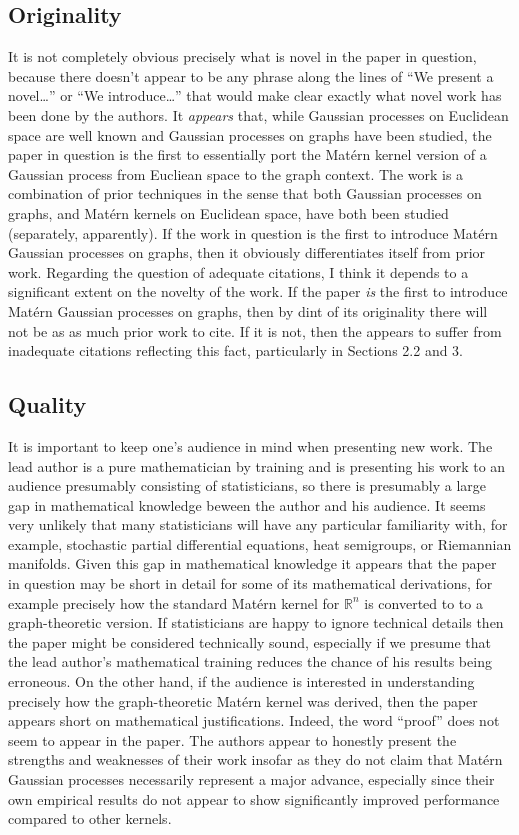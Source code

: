 \subsection{Originality}

It is not completely obvious precisely what is novel in the paper in question, because there doesn't appear to be any phrase along the lines of ``We present a novel\dots'' or ``We introduce\dots'' that would make clear exactly what novel work has been done by the authors. It \textit{appears} that, while Gaussian processes on Euclidean space are well known and Gaussian processes on graphs have been studied, the paper in question is the first to essentially port the Mat\'{e}rn kernel version of a Gaussian process from Eucliean space to the graph context. The work is a combination of prior techniques in the sense that both Gaussian processes on graphs, and Mat\'{e}rn kernels on Euclidean space, have both been studied (separately, apparently). If the work in question is the first to introduce Mat\'{e}rn Gaussian processes on graphs, then it obviously differentiates itself from prior work. Regarding the question of adequate citations, I think it depends to a significant extent on the novelty of the work. If the paper \textit{is} the first to introduce Mat\'{e}rn Gaussian processes on graphs, then by dint of its originality there will not be as as much prior work to cite. If it is not, then the appears to suffer from inadequate citations reflecting this fact, particularly in Sections 2.2 and 3.

\subsection{Quality}

It is important to keep one's audience in mind when presenting new work. The lead author is a pure mathematician by training and is presenting his work to an audience presumably consisting of statisticians, so there is presumably a large gap in mathematical knowledge beween the author and his audience. It seems very unlikely that many statisticians will have any particular familiarity with, for example, stochastic partial differential equations, heat semigroups, or Riemannian manifolds. Given this gap in mathematical knowledge it appears that the paper in question may be short in detail for some of its mathematical derivations, for example precisely how the standard Mat\'{e}rn kernel for $\mathbb R^n$ is converted to to a graph-theoretic version. If statisticians are happy to ignore technical details then the paper might be considered technically sound, especially if we presume that the lead author's mathematical training reduces the chance of his results being erroneous. On the other hand, if the audience is interested in understanding precisely how the graph-theoretic Mat\'{e}rn kernel was derived, then the paper appears short on mathematical justifications. Indeed, the word ``proof'' does not seem to appear in the paper. The authors appear to honestly present the strengths and weaknesses of their work insofar as they do not claim that Mat\'{e}rn Gaussian processes necessarily represent a major advance, especially since their own empirical results do not appear to show significantly improved performance compared to other kernels.

